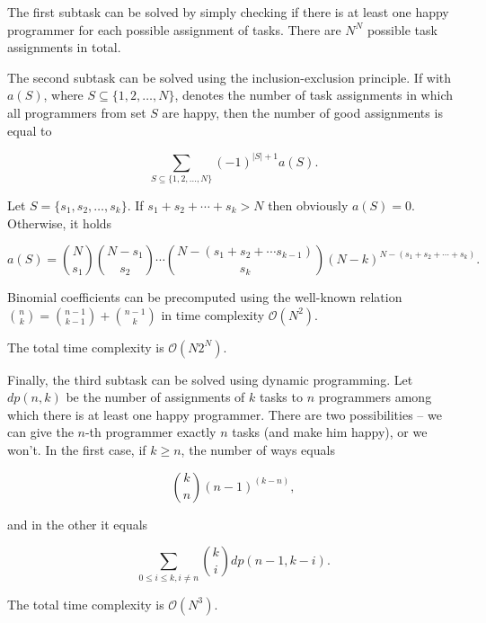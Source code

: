 \documentclass[a4paper]{article}
\begin{document}
The first subtask can be solved by simply checking if there is at least one
happy programmer for each possible assignment of tasks. There are $N^N$
possible task assignments in total.

The second subtask can be solved using the inclusion-exclusion principle.
If with $a(S)$, where $S \subseteq \{1, 2, \ldots, N\}$, denotes the number
of task assignments in which all programmers from set $S$ are happy, then the
number of good assignments is equal to

$$\sum_{S \subseteq \{1, 2, \ldots, N\}}{(-1)^{|S| + 1} a(S)}.$$

Let $S = \{s_1, s_2, \ldots, s_k\}$. If $s_1 + s_2 + \cdots + s_k > N$
then obviously $a(S) = 0$. Otherwise, it holds

$$a(S) = \binom{N}{s_1} \binom{N - s_1}{s_2} \cdots \binom{N - (s_1 + s_2 +
\cdots s_{k-1})}{s_k} (N - k)^{N - (s_1 + s_2 + \cdots + s_k)}.$$

Binomial coefficients can be precomputed using the well-known relation
$\binom{n}{k} = \binom{n - 1}{k - 1} + \binom{n - 1}{k}$ in time complexity
$\mathcal{O}(N^2)$.

The total time complexity is $\mathcal{O}(N 2^N)$.

Finally, the third subtask can be solved using dynamic programming. Let $dp(n, k)$
be the number of assignments of $k$ tasks to $n$ programmers among which there is
at least one happy programmer. There are two possibilities -- we can give the $n$-th
programmer exactly $n$ tasks (and make him happy), or we won't. In the first case,
if $k \geq n$, the number of ways equals

$$\binom{k}{n} (n - 1)^{(k - n)},$$

and in the other it equals

$$\sum_{0 \leq i \leq k, i \neq n}{\binom{k}{i} dp(n - 1, k - i)}.$$

The total time complexity is $\mathcal{O}(N^3)$.
\end{document}
